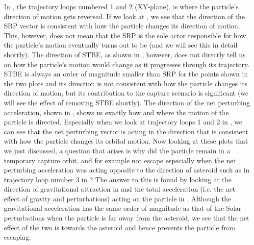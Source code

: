 In , the trajectory loops numbered 1 and 2 (XY-plane), is where the particle's direction of motion gets reversed. If we look at , we see that the direction of the \gls{SRP} vector is consistent with how the particle changes its direction of motion. This, however, does not mean that the \gls{SRP} is the sole actor responsible for how the particle's motion eventually turns out to be (and we will see this in detail shortly). The direction of \gls{STBE}, as shown in , however, does not directly tell us on how the particle's motion would change as it progresses through its trajectory. \gls{STBE} is always an order of magnitude smaller than \gls{SRP} for the points shown in the two plots and its direction is not consistent with how the particle changes its direction of motion, but its contribution to the capture scenario is significant (we will see the effect of removing \gls{STBE} shortly). The direction of the net perturbing acceleration, shown in , shows us exactly how and where the motion of the particle is directed. Especially when we look at trajectory loops 1 and 2 in , we can see that the net perturbing vector is acting in the direction that is consistent with how the particle changes its orbital motion. Now looking at these plots that we just discussed, a question that arises is why did the particle remain in a temporary capture orbit, and for example not escape especially when the net perturbing acceleration was acting opposite to the direction of asteroid such as in trajectory loop number 3 in ? The answer to this is found by looking at the direction of gravitational attraction in  and the total acceleration (i.e. the net effect of gravity and perturbations) acting on the particle in . Although the gravitational acceleration has the same order of magnitude as that of the Solar perturbations when the particle is far away from the asteroid, we see that the net effect of the two is towards the asteroid and hence prevents the particle from escaping.
